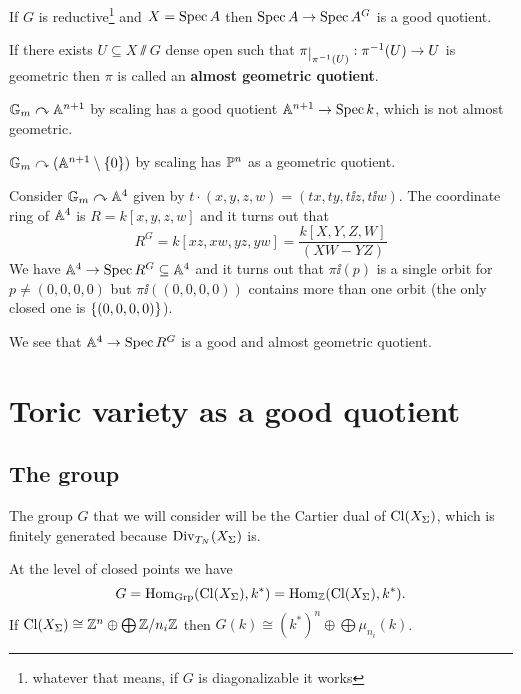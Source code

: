 \begin{fact}[]
If $G$ is reductive\footnote{whatever that means, if $G$ is diagonalizable it works} and $X=\operatorname{Spec} A$ then $\operatorname{Spec} A\to \operatorname{Spec} A^G$ is a good quotient. 
\end{fact}

\begin{definition}[]
If there exists $U\subseteq X\sslash G$ dense open such that $\pi\res{\pi\ii(U)}:\pi\ii(U)\to U$ is geometric then $\pi$ is called an \textbf{almost geometric quotient}.
\end{definition}

\begin{example}
$\mathbb{G}_m\curvearrowright \mathbb{A}^{n+1}$ by scaling has a good quotient $\mathbb{A}^{n+1}\to \operatorname{Spec} k$, which is not almost geometric.
\end{example}

\begin{example}
$\mathbb{G}_m\curvearrowright(\mathbb{A}^{n+1}\setminus\{0\})$ by scaling has $\mathbb{P}^n$ as a geometric quotient.
\end{example}


\begin{example}
Consider $\mathbb{G}_m\curvearrowright \mathbb{A}^4$ given by $t\cdot(x,y,z,w)=(tx,ty,t\ii z,t\ii w)$. The coordinate ring of $\mathbb{A}^4$ is $R=k[x,y,z,w]$ and it turns out that
\[R^G=k[xz,xw,yz,yw]=\frac{k[X,Y,Z,W]}{(XW-YZ)}\]
We have $\mathbb{A}^4\to \operatorname{Spec} R^G\subseteq \mathbb{A}^4$ and it turns out that $\pi\ii(p)$ is a single orbit for $p\neq (0,0,0,0)$ but $\pi\ii((0,0,0,0))$ contains more than one orbit (the only closed one is $\left\{{(0,0,0,0)}\right\}$).

We see that $\mathbb{A}^4\to \operatorname{Spec} R^G$ is a good and almost geometric quotient.
\end{example}


\section{Toric variety as a good quotient}
\subsection{The group}
The group $G$ that we will consider will be the Cartier dual of $\operatorname{Cl}(X_\Sigma)$, which is finitely generated because $\operatorname{Div}_{T_N}(X_\Sigma)$ is.

At the level of closed points we have
\[G=\operatorname{Hom}_{\operatorname{Grp}}(\operatorname{Cl}(X_\Sigma),k^\ast)=\operatorname{Hom}_{\mathbb{Z}}(\operatorname{Cl}(X_{\Sigma}),k^\ast).\]
If $\operatorname{Cl}(X_\Sigma)\cong \mathbb{Z}^n\oplus \bigoplus {\mathbb{Z}/{n_i}\mathbb{Z}}$ then $G(k)\cong (k^\ast)^n\oplus\bigoplus \mu_{n_i}(k)$.

